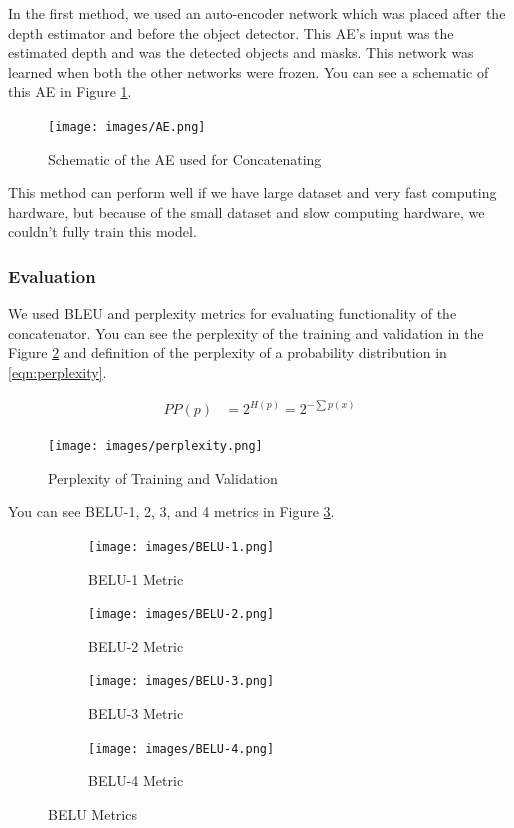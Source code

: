 \documentclass[a4paper, openany]{book}
\begin{document}
In the first method, we used an auto-encoder network which was placed after the depth estimator and before the object detector. This AE's input was the estimated depth and was the detected objects and masks. This network was learned when both the other networks were frozen. You can see a schematic of this AE in Figure \ref{fig:AE}.


\begin{figure}[ht]
  \centering
    \texttt{[image: images/AE.png]}
      \caption{Schematic of the AE used for Concatenating}
  \label{fig:AE}
\end{figure}

This method can perform well if we have large dataset and very fast computing hardware, but because of the small dataset and slow computing hardware, we couldn't fully train this model.

\subsubsection{Evaluation}

We used BLEU and perplexity metrics for evaluating functionality of the concatenator. You can see the perplexity of the training and validation in the Figure \ref{fig:perplexity} and definition of the perplexity of a probability distribution in \ref{eqn:perplexity}.

\begin{eqnarray}
PP(p) &= 2^{H(p)} = 2^{-\sum p(x)} \label{eqn:perplexity}
\end{eqnarray}

\begin{figure}[ht]
  \centering
    \texttt{[image: images/perplexity.png]}
      \caption{Perplexity of Training and Validation}
  \label{fig:perplexity}
\end{figure}

\newpage

You can see BELU-1, 2, 3, and 4 metrics in Figure \ref{fig:BELU}.
\begin{figure}[ht]
  \centering
  
    \begin{subfigure}[b]{0.9\linewidth}
    \texttt{[image: images/BELU-1.png]}
    \caption{BELU-1 Metric}
  \end{subfigure}
  \begin{subfigure}[b]{0.9\linewidth}
    \texttt{[image: images/BELU-2.png]}
    \caption{BELU-2 Metric}
  \end{subfigure}
      \begin{subfigure}[b]{0.9\linewidth}
    \texttt{[image: images/BELU-3.png]}
    \caption{BELU-3 Metric}
  \end{subfigure}
  \begin{subfigure}[b]{0.9\linewidth}
    \texttt{[image: images/BELU-4.png]}
    \caption{BELU-4 Metric}
  \end{subfigure}
  
      \caption{BELU Metrics}
  \label{fig:BELU}
\end{figure}
\end{document}
